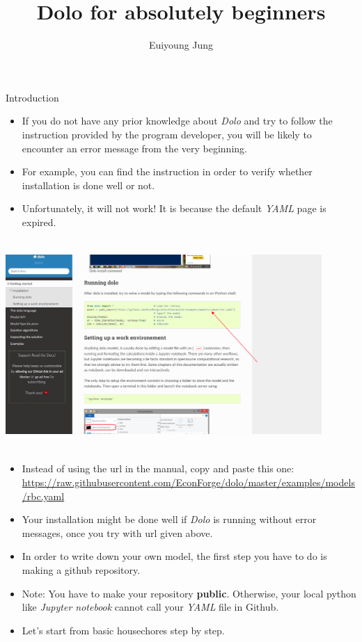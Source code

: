 \documentclass{beamer}
\title{Dolo for absolutely beginners}
\author{Euiyoung Jung}
\institute{PSE}
\date{} %
\begin{document}
{ 
\frame{\titlepage}}


\begin{frame}{Introduction}
    \begin{itemize}
        \item If you do not have any prior knowledge about \textit{Dolo} and try to follow the instruction provided by the program developer, you will be likely to encounter an error message from the very beginning. 
        \item For example, you can find the  instruction in order to verify whether installation is done well or not.
        \item Unfortunately, it will not work! It is because the default \textit{YAML} page is expired.
    \end{itemize}
    \end{frame}
\begin{frame}
     \includegraphics[width=12cm, height= 8cm]{dolo4.png} 
\end{frame}
\begin{frame}
    \begin{itemize}
    \item Instead of using the url in the manual, copy and paste this one: \url{https://raw.githubusercontent.com/EconForge/dolo/master/examples/models/rbc.yaml}  
    \item Your installation might be done well if \textit{Dolo} is running without error messages, once you try with url given above. 
        \item In order to write down your own model, the first step you have to do is making a github repository.
        \item Note: You have to make your repository \textbf{public}. Otherwise, your local python like \textit{Jupyter notebook} cannot call your \textit{YAML} file in Github. 
        \item Let's start from basic housechores step by step. 
    \end{itemize}
\end{frame}
\end{document}
